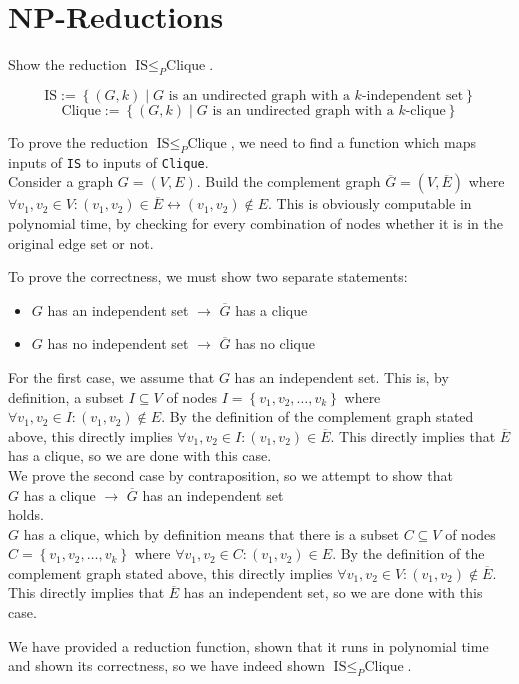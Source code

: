 



\section{\textsc{NP}-Reductions}

Show the reduction $\text{IS}\leq_{P}\text{Clique}$.

$$\text{IS}:=\left\{(G,k)\mid G\text{ is an undirected graph with a }k\text{-independent set}\right\}$$
$$\text{Clique}:=\left\{(G,k)\mid G\text{ is an undirected graph with a }k\text{-clique}\right\}$$

To prove the reduction $\text{IS}\leq_{P}\text{Clique}$, we need to find a function which maps inputs of \texttt{IS} to inputs of \texttt{Clique}.\\
Consider a graph $G = (V,E)$. Build the complement graph $\overline{G} = (V, \overline{E})$ where $\forall v_{1}, v_{2} \in V: (v_{1},v_{2}) \in \overline{E} \leftrightarrow (v_{1},v_{2}) \notin E$. This is obviously computable in polynomial time, by checking for every combination of nodes whether it is in the original edge set or not.

To prove the correctness, we must show two separate statements:
\begin{itemize}
    \item $G$ has an independent set $\rightarrow$ $\overline{G}$ has a clique
    \item $G$ has no independent set $\rightarrow$ $\overline{G}$ has no clique
\end{itemize}
For the first case, we assume that $G$ has an independent set. This is, by definition, a subset $I\subseteq V$ of nodes $I = \left\{v_{1}, v_{2}, \ldots, v_{k}\right\}$ where $\forall v_{1},v_{2} \in I: (v_{1},v_{2})\notin E$. By the definition of the complement graph stated above, this directly implies $\forall v_{1},v_{2} \in I: (v_{1},v_{2})\in \overline{E}$. This directly implies that $\overline{E}$ has a clique, so we are done with this case.\\
We prove the second case by contraposition, so we attempt to show that\\
\phantom{x}\hspace{0.4cm}$G$ has a clique $\rightarrow$ $\overline{G}$ has an independent set\\
holds.\\
$G$ has a clique, which by definition means that there is a subset $C\subseteq V$ of nodes $C = \left\{v_{1}, v_{2}, \ldots, v_{k}\right\}$ where $\forall v_{1},v_{2} \in C: (v_{1},v_{2})\in E$. By the definition of the complement graph stated above, this directly implies $\forall v_{1},v_{2} \in V: (v_{1},v_{2})\notin \overline{E}$. This directly implies that $\overline{E}$ has an independent set, so we are done with this case.

We have provided a reduction function, shown that it runs in polynomial time and shown its correctness, so we have indeed shown $\text{IS}\leq_{P}\text{Clique}$.



